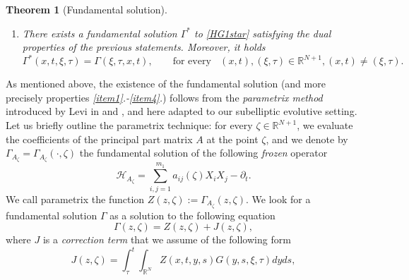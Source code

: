 \documentclass[11pt,a4paper]{article}
\newtheorem{theorem}{\bf Theorem}[section]
\numberwithin{equation}{section}
\def \rn {{\mathbb {R}}^{N}}
\def \rnn {{\mathbb {R}}^{N+1}}
\def \p {\partial}
\def \h {\mathscr{H}}
\def \G {{\Gamma}}
\def \t {{\tau}}
\def \x {{\xi}}
\def \z {{\zeta}}
\begin{document}
\begin{theorem}[Fundamental solution]
\begin{enumerate}
\begin{equation}
			\min \left(\frac{c_u}{2h_1(2k_1^2-1)},\frac{3c_u}{h_1}\right)>T.
		\end{equation}
		where $T$ is the constant given by \emph{\ref{item4}.}, $c_u$ is the same as in \emph{\ref{item2}.}, and $k_1$ is given by \eqref{k1}, then  there exist $C,M>0$ such that for every $(x,t)\in\rn \times (T_1,T)$ the function $u$ defined in \eqref{u-conv} verifies 
		\begin{equation}\label{egrowth}
			|u(x,t)|\leq C \exp\Big(Md_X(x,0)^2\Big).
		\end{equation}
		Furthermore, there exists at most one classical solution $u$ to \eqref{cauchy} such that 
		\begin{equation}\label{integralestgr}
			\int_{T_1}^{T}\int_{\rn} |u(x,t)|\exp\Big(-k\,d_X(x,0)^2\Big)dxdt<+\infty,
		\end{equation}
		for some $k>0$.\label{item9}
		\item There exists a fundamental solution $\G^*$ to \eqref{HG1star} satisfying the dual properties of the previous statements. Moreover, it holds
		\begin{equation}\label{index}
			\G^*(x,t,\x,\t)=\G(\x,\t,x,t),\qquad \text{for every }\;\;(x,t),(\x,\t)\in\rnn, (x,t)\neq (\x,\t).
		\end{equation} \label{item10}
	\end{enumerate}
\end{theorem}
As mentioned above, the existence of the fundamental solution (and more precisely properties \emph{\ref{item1}.-\ref{item4}.}) follows from the  \emph{parametrix method} introduced by Levi in \cite{levi1907sulle} and \cite{levi1909problemi}, and here adapted to our subelliptic evolutive setting. Let us briefly outline the parametrix technique: for every $\z \in \rnn$,  we evaluate the coefficients of the principal part matrix $A$ at the point $\z$, and we denote by $\G_{A_\z}=\G_{A_\z}(\cdot,\zeta)$ the fundamental solution of the following \textit{frozen} operator
\begin{equation}\label{HGfreeze}
	\h_{A_\z}=\sum_{i,j=1}^{m_1} a_{ij}(\z)X_iX_j-\p_t.
\end{equation}
We call parametrix the function $Z(z,\z):=\G_{A_\z}(z,\z)$. We look for a fundamental solution $\G$ as a solution to the following equation
\begin{equation}\label{G=Z+J}
	\G(z,\z)=Z(z,\z)+J(z,\z),
\end{equation}
where $J$ is a \emph{correction term} that we assume of the following form
\begin{equation}\label{J}
	J(z,\z)=\int_\t^t\int_{\rn} Z(x,t,y,s)G(y,s,\x,\t)dyds,
\end{equation}
\end{document}
